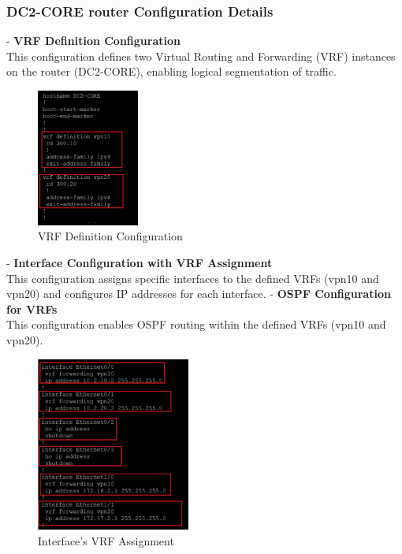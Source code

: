 \documentclass[12pt,english]{report}
\begin{document}
\subsubsection{DC2-CORE router Configuration Details}
- \textbf{VRF Definition Configuration} \\
   This configuration defines two Virtual Routing and Forwarding (VRF) instances on the router (DC2-CORE), enabling logical segmentation of traffic.
\begin{figure}[H]
    \centering
    \includegraphics[width= 0.3\textwidth]{chapitre 3/9.png}
    \caption{VRF Definition Configuration}
    \label{fig: VRF Definition Configuration}
\end{figure}
- \textbf{Interface Configuration with VRF Assignment} \\
    This configuration assigns specific interfaces to the defined VRFs (vpn10 and vpn20) and configures IP addresses for each interface. 
- \textbf{OSPF Configuration for VRFs} \\
    This configuration enables OSPF routing within the defined VRFs (vpn10 and vpn20).
\begin{figure}[H]
    \centering
    \includegraphics[width= 0.45\textwidth]{chapitre 3/10.png}
    \caption{Interface's VRF Assignment}
    \label{fig: Interface's VRF Assignment}
\end{figure}
\end{document}
